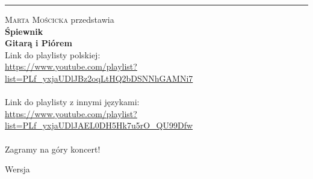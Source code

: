 \documentclass[12pt,a4paper,titlepage,openany]{book}
\begin{document}

\begin{titlepage} %
	\raggedleft %
	
	\rule{1pt}{\textheight} %
	\hspace{0.05\textwidth} %
	\parbox[b]{0.75\textwidth}{ %
		
		{\textsc{Marta Mościcka} przedstawia}
		\\[2\baselineskip] 		
		{\Huge\bfseries Śpiewnik \\[0.5\baselineskip] Gitarą i Piórem}
		\\[14\baselineskip] 		
		{
		Link do playlisty polskiej:\\
		{\small \url{https://www.youtube.com/playlist?list=PLf_yxjaUDlJBz2oqLtHQ2bDSNNhGAMNi7}}\\
		\\
		Link do playlisty z innymi językami:\\
		{\small \url{https://www.youtube.com/playlist?list=PLf_yxjaUDlJAEL0DH5Hk7u5rO_QU99Dfw}}\\
		\\
		Zagramy na góry koncert!}	
		
		\begin{flushright}
		Wersja~~
		\end{flushright}
	}
\end{titlepage}
\raggedbottom
\pagestyle{plain}

\tableofcontents
\end{document}
